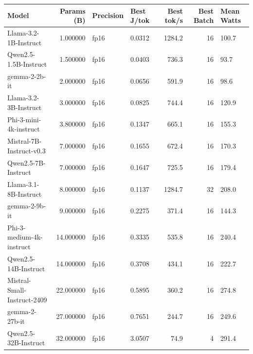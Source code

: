\begin{tabular}{lrllrrl}
\toprule
Model & Params (B) & Precision & Best J/tok & Best tok/s & Best Batch & Mean Watts \\
\midrule
Llama-3.2-1B-Instruct & 1.000000 & fp16 & 0.0312 & 1284.2 & 16 & 100.7 \\
Qwen2.5-1.5B-Instruct & 1.500000 & fp16 & 0.0403 & 736.3 & 16 & 93.7 \\
gemma-2-2b-it & 2.000000 & fp16 & 0.0656 & 591.9 & 16 & 98.6 \\
Llama-3.2-3B-Instruct & 3.000000 & fp16 & 0.0825 & 744.4 & 16 & 120.9 \\
Phi-3-mini-4k-instruct & 3.800000 & fp16 & 0.1347 & 665.1 & 16 & 155.3 \\
Mistral-7B-Instruct-v0.3 & 7.000000 & fp16 & 0.1655 & 672.4 & 16 & 170.3 \\
Qwen2.5-7B-Instruct & 7.000000 & fp16 & 0.1647 & 725.5 & 16 & 179.4 \\
Llama-3.1-8B-Instruct & 8.000000 & fp16 & 0.1137 & 1284.7 & 32 & 208.0 \\
gemma-2-9b-it & 9.000000 & fp16 & 0.2275 & 371.4 & 16 & 144.3 \\
Phi-3-medium-4k-instruct & 14.000000 & fp16 & 0.3335 & 535.8 & 16 & 240.4 \\
Qwen2.5-14B-Instruct & 14.000000 & fp16 & 0.3708 & 434.1 & 16 & 222.7 \\
Mistral-Small-Instruct-2409 & 22.000000 & fp16 & 0.5895 & 360.2 & 16 & 274.8 \\
gemma-2-27b-it & 27.000000 & fp16 & 0.7651 & 244.7 & 16 & 249.6 \\
Qwen2.5-32B-Instruct & 32.000000 & fp16 & 3.0507 & 74.9 & 4 & 291.4 \\
\bottomrule
\end{tabular}
